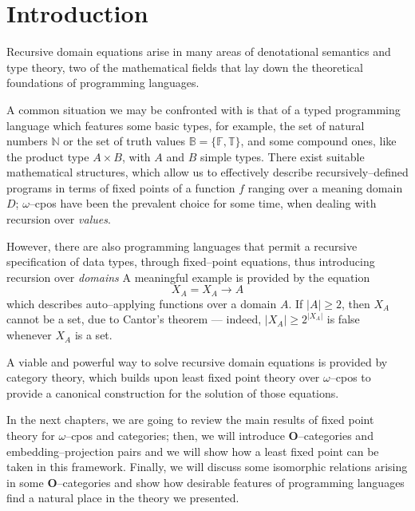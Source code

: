 \section{Introduction}
\nocite{winskel1993formal}
\nocite{bos-hemerik}

Recursive domain equations arise in many areas of denotational semantics and type theory, two of the mathematical fields that lay down the theoretical foundations of programming languages.

A common situation we may be confronted with is that of a typed programming language which features some basic types, for example, the set of natural numbers \(\mathbb{N}\) or the set of truth values \(\mathbb{B} = \lbrace \mathbb{F}, \mathbb{T} \rbrace\), and some compound ones, like the product type \(A \times B\), with \(A\) and \(B\) simple types. %
There exist suitable mathematical structures, which allow us to effectively describe recursively--defined programs in terms of fixed points of a function \(f\) ranging over a meaning domain \(D\); \(\omega\)--cpos have been the prevalent choice for some time, when dealing with recursion over \emph{values}.

However, there are also programming languages that permit a recursive specification of data types, through fixed--point equations, thus introducing recursion over \emph{domains}
A meaningful example is provided by the equation
\begin{equation*}
  X_A = X_A \to A
\end{equation*}
which describes auto--applying functions over a domain \(A\).
If \(\lvert A \rvert \ge 2\), then \(X_A\) cannot be a set, due to Cantor's theorem --- indeed, \(\lvert X_A \rvert \ge 2^{\lvert X_A \rvert}\) is false whenever \(X_A\) is a set.

A viable and powerful way to solve recursive domain equations is provided by category theory, which builds upon least fixed point theory over \(\omega\)--cpos to provide a canonical construction for the solution of those equations.

In the next chapters, we are going to review the main results of fixed point theory for \(\omega\)--cpos and categories; then, we will introduce \(\mathbf{O}\)--categories and embedding--projection pairs and we will show how a least fixed point can be taken in this framework.
Finally, we will discuss some isomorphic relations arising in some \(\mathbf{O}\)--categories and show how desirable features of programming languages find a natural place in the theory we presented.
